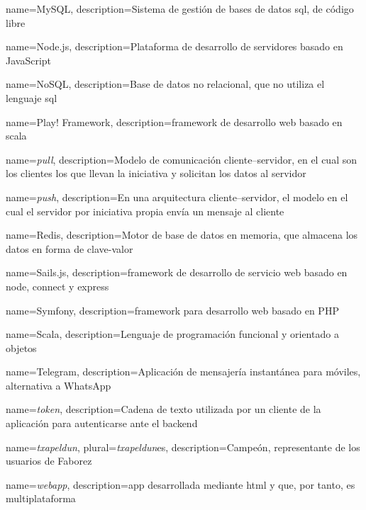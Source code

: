 {
  name={MySQL},
  description={Sistema de gestión de bases de datos \gls{sql}, de código libre}
}

{
  name={Node.js},
  description={Plataforma de desarrollo de servidores basado en JavaScript}
}

{
  name={NoSQL},
  description={Base de datos no relacional, que no utiliza
    el lenguaje \gls{sql}}
}

{
  name={Play! Framework},
  description={\Gls{framework} de desarrollo web basado en \gls{scala}}
}

{
  name={\emph{pull}},
  description={Modelo de comunicación cliente--servidor, en el cual son los clientes los que llevan la iniciativa y solicitan los datos al servidor}
}

{
  name={\emph{push}},
  description={En una arquitectura cliente--servidor, el modelo en el cual el servidor por iniciativa propia envía un mensaje al cliente}
}

{
  name={Redis},
  description={Motor de base de datos en memoria, que almacena los datos en forma de clave-valor}
}

{
  name={Sails.js},
  description={\Gls{framework} de desarrollo de servicio web basado en \gls{node}, \gls{connect} y \gls{express}}
}

{
  name={Symfony},
  description={\Gls{framework} para desarrollo web basado en PHP}
}

{
  name={Scala},
  description={Lenguaje de programación funcional y orientado a objetos}
}

{
  name={Telegram},
  description={Aplicación de mensajería instantánea para móviles, alternativa a WhatsApp}
}

{
  name={\emph{token}},
  description={Cadena de texto utilizada por un cliente de la aplicación para autenticarse ante el \gls{backend}}
}

{
  name={\emph{txapeldun}},
  plural={\emph{txapeldun}es},
  description={Campeón, representante de los usuarios de Faborez}
}

{
  name={\emph{webapp}},
  description={\Gls{app} desarrollada mediante \gls{html} y que, por tanto, es multiplataforma}
}

